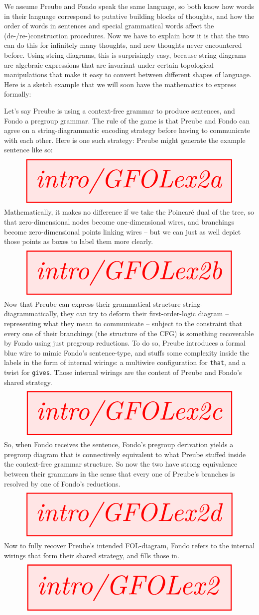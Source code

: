 \begin{fullwidth}
We assume Preube and Fondo speak the same language, so both know how words in their language correspond to putative building blocks of thoughts, and how the order of words in sentences and special grammatical words affect the (de-/re-)construction procedures. Now we have to explain how it is that the two can do this for infinitely many thoughts, and new thoughts never encountered before. Using string diagrams, this is surprisingly easy, because string diagrams are algebraic expressions that are invariant under certain topological manipulations that make it easy to convert between different shapes of language. Here is a sketch example that we will soon have the mathematics to express formally:\\

\begin{example}
Let's say Preube is using a context-free grammar to produce sentences, and Fondo a pregroup grammar. The rule of the game is that Preube and Fondo can agree on a string-diagrammatic encoding strategy before having to communicate with each other. Here is one such strategy: Preube might generate the example sentence like so:
\[\resizebox{\textwidth}{!}{\tikzfig{intro/GFOLex2a}}\]
Mathematically, it makes no difference if we take the Poincar\'{e} dual of the tree, so that zero-dimensional nodes become one-dimensional wires, and branchings become zero-dimensional points linking wires -- but we can just as well depict those points as boxes to label them more clearly.
\[\resizebox{\textwidth}{!}{\tikzfig{intro/GFOLex2b}}\]
Now that Preube can express their grammatical structure string-diagrammatically, they can try to deform their first-order-logic diagram -- representing what they mean to communicate -- subject to the constraint that every one of their branchings (the structure of the CFG) is something recoverable by Fondo using just pregroup reductions. To do so, Preube introduces a formal blue wire to mimic Fondo's sentence-type, and stuffs some complexity inside the labels in the form of internal wirings: a multiwire configuration for \texttt{that}, and a twist for \texttt{gives}. Those internal wirings are the content of Preube and Fondo's shared strategy.
\[\resizebox{\textwidth}{!}{\tikzfig{intro/GFOLex2c}}\]
So, when Fondo receives the sentence, Fondo's pregroup derivation yields a pregroup diagram that is connectively equivalent to what Preube stuffed inside the context-free grammar structure. So now the two have strong equivalence between their grammars in the sense that every one of Preube's branches is resolved by one of Fondo's reductions.
\[\resizebox{\textwidth}{!}{\tikzfig{intro/GFOLex2d}}\]
Now to fully recover Preube's intended FOL-diagram, Fondo refers to the internal wirings that form their shared strategy, and fills those in.
\[\resizebox{\textwidth}{!}{\tikzfig{intro/GFOLex2}}\]
\end{example}


\end{fullwidth}
